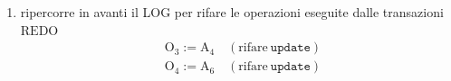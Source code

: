{\begin{enumerate}
\[\begin{aligned}
        &O_2 := B_3 \ \quad (\text{disfare} \ \texttt{update})\\
        &\mathrm{O_1 := B_1 \quad (\text{disfare} \ \texttt{update})}\\
      \end{aligned}
    \]
    \smallskip
    \item  ripercorre in avanti il LOG per rifare le operazioni eseguite dalle transazioni $\mathrm{REDO}$
    \[
      \begin{aligned}
        &\mathrm{O_3 := A_4  \quad (\text{rifare} \ \texttt{update})}\\
        &\mathrm{O_4 := A_6 \quad (\text{rifare} \ \texttt{update})}\\
      \end{aligned}
    \]
  \end{enumerate}
}


